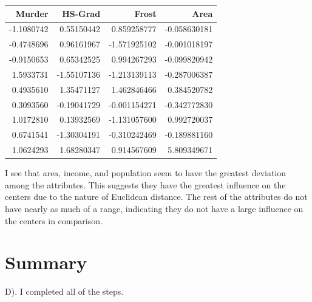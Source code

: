 \documentclass[11pt]{article}
\begin{document}
\begin{center}
\begin{tabular}{rrrr}
Murder & HS-Grad & Frost & Area\\
\hline
-1.1080742 & 0.55150442 & 0.859258777 & -0.058630181\\
-0.4748696 & 0.96161967 & -1.571925102 & -0.001018197\\
-0.9150653 & 0.65342525 & 0.994267293 & -0.099820942\\
1.5933731 & -1.55107136 & -1.213139113 & -0.287006387\\
0.4935610 & 1.35471127 & 1.462846466 & 0.384520782\\
0.3093560 & -0.19041729 & -0.001154271 & -0.342772830\\
1.0172810 & 0.13932569 & -1.131057600 & 0.992720037\\
0.6741541 & -1.30304191 & -0.310242469 & -0.189881160\\
1.0624293 & 1.68280347 & 0.914567609 & 5.809349671\\
\end{tabular}
\end{center}

I see that area, income, and population seem to have the greatest deviation among the
attributes. This suggests they have the greatest influence on the centers due
to the nature of Euclidean distance. The rest of the attributes do not have
nearly as much of a range, indicating they do not have a large influence on
the centers in comparison.

\section*{Summary}
\label{sec:org9fc90bc}
D). I completed all of the steps.
\end{document}
